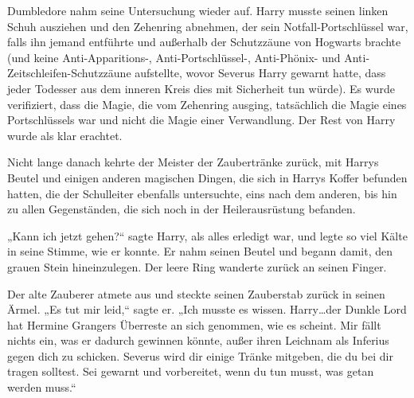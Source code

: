 Dumbledore nahm seine Untersuchung wieder auf. Harry musste seinen linken Schuh ausziehen und den Zehenring abnehmen, der sein Notfall-Portschlüssel war, falls ihn jemand entführte und außerhalb der Schutzzäune von Hogwarts brachte (und keine Anti-Apparitions-, Anti-Portschlüssel-, Anti-Phönix- und Anti-Zeitschleifen-Schutzzäune aufstellte, wovor Severus Harry gewarnt hatte, dass jeder Todesser aus dem inneren Kreis dies mit Sicherheit tun würde). Es wurde verifiziert, dass die Magie, die vom Zehenring ausging, tatsächlich die Magie eines Portschlüssels war und nicht die Magie einer Verwandlung. Der Rest von Harry wurde als klar erachtet.

Nicht lange danach kehrte der Meister der Zaubertränke zurück, mit Harrys Beutel und einigen anderen magischen Dingen, die sich in Harrys Koffer befunden hatten, die der Schulleiter ebenfalls untersuchte, eins nach dem anderen, bis hin zu allen Gegenständen, die sich noch in der Heilerausrüstung befanden.

„Kann ich jetzt gehen?“ sagte Harry, als alles erledigt war, und legte so viel Kälte in seine Stimme, wie er konnte. Er nahm seinen Beutel und begann damit, den grauen Stein hineinzulegen. Der leere Ring wanderte zurück an seinen Finger.

Der alte Zauberer atmete aus und steckte seinen Zauberstab zurück in seinen Ärmel.
„Es tut mir leid,“ sagte er. „Ich musste es wissen. Harry…der Dunkle Lord hat Hermine Grangers Überreste an sich genommen, wie es scheint. Mir fällt nichts ein, was er dadurch gewinnen könnte, außer ihren Leichnam als Inferius gegen dich zu schicken. Severus wird dir einige Tränke mitgeben, die du bei dir tragen solltest. Sei gewarnt und vorbereitet, wenn du tun musst, was getan werden muss.“

